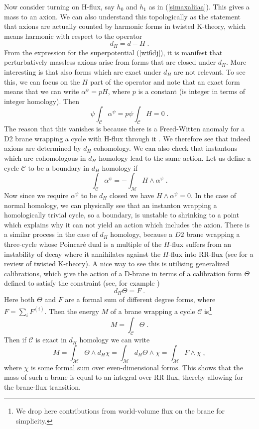 \documentclass[11pt,a4paper]{article}
\numberwithin{equation}{section}
\numberwithin{table}{section}\setlength{\multlinegap}{25pt}
\newcommand{\cC}{\mathcal{C}}
\newcommand{\cM}{\mathcal M}
\newcommand{\be}{\begin{equation}}
\newcommand{\ee}{\end{equation}}
\begin{document}
Now consider turning on H-flux, say $h_0$ and $h_1$ as in (\ref{simaxaliiaa}). This gives a mass to an axion. We can also understand this topologically as the statement that axions are actually counted by harmonic forms in twisted K-theory, which means harmonic with respect to the operator
\be
d_H = d - H \;.
\ee
From the expression for the superpotential (\ref{wt6dj}), it is manifest that perturbatively massless axions arise from forms that are closed under $d_H$. More interesting is that also forms which are exact under $d_H$ are not relevant. To see this, we can focus on the $H$ part of the operator and note that an exact form means that we can write $\alpha^{\psi} = p H$, where $p$ is a constant (is integer in terms of integer homology). Then 
\be
\psi  \int_{\cC} \alpha^{\psi} = p \psi \int_{\cC} H = 0 \;.
\ee
The reason that this vanishes is because there is a Freed-Witten anomaly for a D2 brane wrapping a cycle with H-flux through it \cite{Freed:1999vc}. We therefore see that indeed axions are determined by $d_H$ cohomology. We can also check that instantons which are cohomologous in $d_H$ homology lead to the same action. Let us define a cycle $\cC$ to be a boundary in $d_H$ homology if 
\be
\int_{\cC} \alpha^{\psi} = -\int_{\cM} H \wedge \alpha^{\psi} \;.
\ee
Now since we require $\alpha^{\psi}$ to be $d_H$ closed we have $H \wedge \alpha^{\psi} = 0$. In the case of normal homology, we can physically see that an instanton wrapping a homologically trivial cycle, so a boundary, is unstable to shrinking to a point which explains why it can not yield an action which includes the axion. There is a similar process in the case of $d_H$ homology, because a $D2$ brane wrapping a three-cycle whose Poincar\'e dual is a multiple of the $H$-flux suffers from an instability of decay where it annihilates against the $H$-flux into RR-flux (see \cite{Evslin:2006cj} for a review of twisted K-theory). A nice way to see this is utilising generalized calibrations, which give the action of a D-brane in terms of a calibration form $\Theta$ defined to satisfy the constraint (see, for example \cite{Martucci:2005ht})
\be
d_H \Theta = F \;.
\ee
Here both $\Theta$ and $F$ are a formal sum of different degree forms, where $F = \sum_i F^{(i)}$. Then the energy $M$ of a brane wrapping a cycle $\cC$ is\footnote{We drop here contributions from world-volume flux on the brane for simplicity.}
\be
M = \int_{\cC} \Theta \;.
\ee
Then if $\cC$ is exact in $d_H$ homology we can write
\be
M = \int_{\cM} \Theta \wedge d_H \chi =  \int_{\cM} d_H \Theta \wedge \chi = \int_{\cM} F \wedge \chi \;,
\ee
where $\chi$ is some formal sum over even-dimensional forms. 
This shows that the mass of such a brane is equal to an integral over RR-flux, thereby allowing for the brane-flux transition. 
\end{document}

